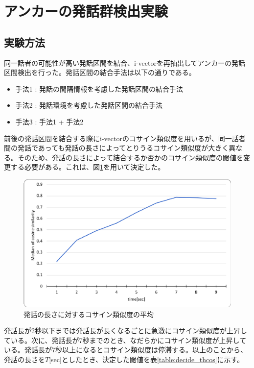 \section{アンカーの発話群検出実験}
\label{chapter:get_anchor}
\subsection{実験方法}
同一話者の可能性が高い発話区間を結合、i-vectorを再抽出してアンカーの発話区間検出を行った。発話区間の結合手法は以下の通りである。

\begin{itemize}
\item 手法1 : 発話の間隔情報を考慮した発話区間の結合手法
\item 手法2 : 発話環境を考慮した発話区間の結合手法
\item 手法3 : 手法1 + 手法2
\end{itemize}

前後の発話区間を結合する際にi-vectorのコサイン類似度を用いるが、同一話者間の発話であっても発話の長さによってとりうるコサイン類似度が大きく異なる。そのため、発話の長さによって結合するか否かのコサイン類似度の閾値を変更する必要がある。これは、図\ref{fig:time_cos}を用いて決定した。

\begin{figure}[H]
  \begin{center}
    \includegraphics[scale=0.8]{./figure/time_cos.eps}
  \end{center}
  \caption{発話の長さに対するコサイン類似度の平均 \label{fig:time_cos}}
\end{figure}

発話長が2秒以下までは発話長が長くなるごとに急激にコサイン類似度が上昇している。次に、発話長が7秒までのとき、なだらかにコサイン類似度が上昇している。発話長が7秒以上になるとコサイン類似度は停滞する。以上のことから、発話の長さを$T$[sec]としたとき、決定した閾値を表\ref{table:decide_thcos}に示す。

